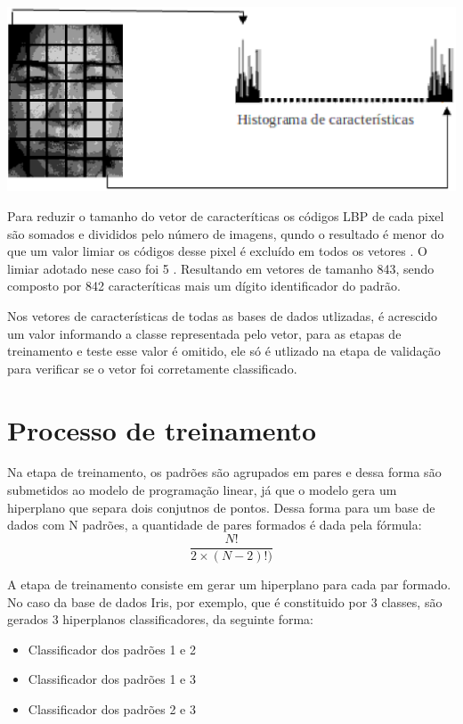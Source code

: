 \begin{itemize}
\begin{center}
	\includegraphics[scale=0.5]{graficos/histograma}
	\label{img:LBPHistograma}
\end{center}

Para reduzir o tamanho do vetor de caracteríticas os códigos LBP de cada pixel são somados e divididos pelo número de imagens, qundo o resultado é menor do que um valor limiar os códigos desse pixel é excluído em todos os vetores \cite{Feng}. O limiar adotado nese caso foi 5 \cite{LBPShan2009}. Resultando em vetores de tamanho 843, sendo composto por 842 caracteríticas mais um dígito identificador do padrão. 
\end{itemize}

Nos vetores de características de todas as bases de dados utlizadas, é acrescido um valor informando a classe representada pelo vetor, para as etapas de treinamento e teste esse valor é omitido, ele só é utlizado na etapa de validação para verificar se o vetor foi corretamente classificado.

\section{Processo de treinamento}
Na etapa de treinamento, os padrões são agrupados em pares e dessa forma são submetidos ao modelo de programação linear, já que o modelo gera um hiperplano que separa dois conjutnos de pontos. Dessa forma para um base de dados com N padrões, a quantidade de pares formados é dada pela fórmula:
$$ \frac{N!}{2\times (N-2)!)} $$

A etapa de treinamento consiste em gerar um hiperplano para cada par formado. No caso da base de dados Iris, por exemplo, que é constituido por 3 classes, são gerados 3 hiperplanos classificadores, da seguinte forma: 
\begin{itemize}
\item{Classificador dos padrões 1 e 2}
\item{Classificador dos padrões 1 e 3}
\item{Classificador dos padrões 2 e 3}
\end{itemize}

